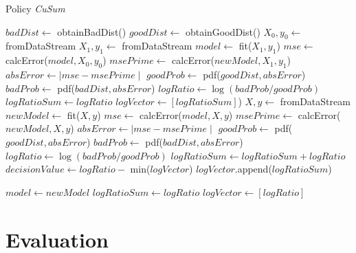 \documentclass{mpaper}
\begin{document}
\begin{algorithm}[!h]
\caption{Policy \textit{CuSum}}\label{polCusum}
\begin{algorithmic}
\State $badDist \gets$ obtainBadDist() 
\State $goodDist \gets$ obtainGoodDist() 
\State $X_0, y_0 \gets$ fromDataStream
\State $X_1, y_1 \gets$ fromDataStream
\State $model \gets$ fit($X_1, y_1$)
\State $mse \gets$ calcError($model,X_0,y_0$)
\State $msePrime \gets$ calcError($newModel,X_1,y_1$)
\State $absError \gets \mid mse - msePrime \mid$
\State $goodProb \gets$ pdf($goodDist,absError$)
\State $badProb \gets$ pdf($badDist,absError$)
\State $logRatio \gets \log(badProb/goodProb)$
\State $logRatioSum \gets logRatio$
\State $logVector \gets [logRatioSum]$)
    \State $X, y \gets$ fromDataStream
    \State $newModel \gets$ fit($X,y$)
    \State $mse \gets$ calcError($model,X,y$)
    \State $msePrime \gets$ calcError($newModel,X,y$)
    \State $absError \gets \mid mse - msePrime \mid$
    \State $goodProb \gets$ pdf($goodDist, absError$)
    \State $badProb \gets$ pdf($badDist, absError$)
    \State $logRatio \gets \log(badProb/goodProb)$
    \State $logRatioSum \gets logRatioSum + logRatio$
    \State $decisionValue \gets logRatio - $ min($logVector$)
    \State $logVector$.append($logRatioSum$)

        \State $model \gets newModel$ 
        \State $logRatioSum \gets logRatio$
        \State $logVector \gets [logRatio]$
    \EndIf
\EndWhile
\end{algorithmic}
\end{algorithm}

\section{Evaluation}
\end{document}
